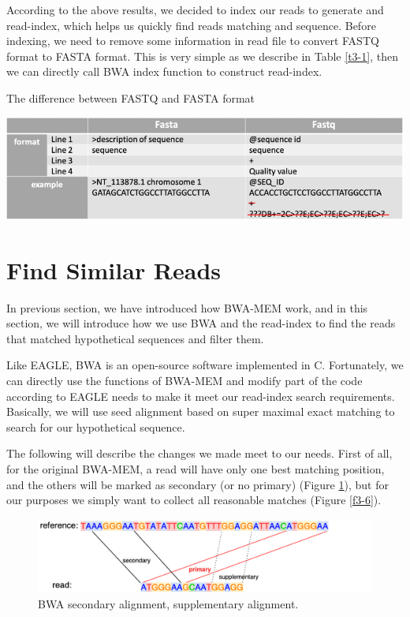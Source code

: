 According to the above results, we decided to index our reads to generate and read-index, which helps us quickly find reads matching and sequence. Before indexing, we need to remove some information in read file to convert FASTQ format to FASTA format. This is very simple as we describe in Table \ref{t3-1}, then we can directly call BWA index function to construct read-index.

\begin{table}[h]
\caption{The difference between FASTQ and FASTA format}
\includegraphics[width=1\textwidth]{body/image/t3-1.png}
\label{t3-1}
\end{table}

\section{Find Similar Reads}
In previous section, we have introduced how BWA-MEM work, and in this section, we will introduce how we use BWA and the read-index to find the reads that matched hypothetical sequences and filter them.

Like EAGLE, BWA is an open-source software implemented in C.  Fortunately, we can directly use the functions of BWA-MEM and modify part of the code according to EAGLE needs to make it meet our read-index search requirements. Basically, we will use seed alignment based on super maximal exact matching to search for our hypothetical sequence.

The following will describe the changes we made meet to our needs. First of all, for the original BWA-MEM, a read will have only one best matching position, and the others will be marked as secondary (or no primary) (Figure \ref{f3-5}), but for our purposes we simply want to collect all reasonable matches (Figure \ref{f3-6}).

\begin{figure}[H]
\vspace{1em}
\includegraphics[width=1\columnwidth]{body/image/3-5.png}
\caption[secondary alignment]{BWA secondary alignment, supplementary alignment.}
\label{f3-5}
\end{figure}

